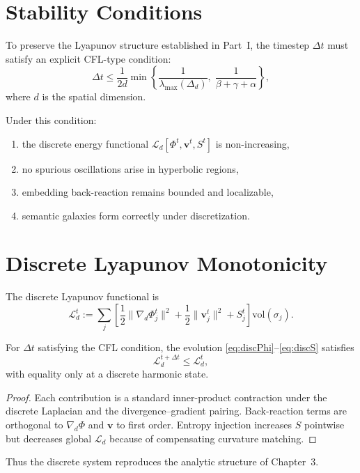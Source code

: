 \section{Stability Conditions}

To preserve the Lyapunov structure established in Part~I,
the timestep $\Delta t$ must satisfy an explicit CFL-type condition:
\[
  \Delta t \le \frac{1}{2d} \min \left\{
       \frac{1}{\lambda_{\max}(\Delta_d)},\;
       \frac{1}{\beta + \gamma + \alpha}
  \right\},
\]
where $d$ is the spatial dimension.

Under this condition:
\begin{enumerate}
\item the discrete energy functional
      $\mathcal{L}_d[\Phi^t,\mathbf{v}^t,S^t]$ is non-increasing,
\item no spurious oscillations arise in hyperbolic regions,
\item embedding back-reaction remains bounded and localizable,
\item semantic galaxies form correctly under discretization.
\end{enumerate}

\section{Discrete Lyapunov Monotonicity}

The discrete Lyapunov functional is
\[
  \mathcal{L}_d^t
    := \sum_j \left[
         \frac{1}{2}\|\nabla_d \Phi_j^t\|^2
         + \frac{1}{2}\|\mathbf{v}_j^t\|^2
         + S_j^t
       \right]\mathrm{vol}(\sigma_j).
\]

\begin{theorem}
For $\Delta t$ satisfying the CFL condition,
the evolution \eqref{eq:discPhi}--\eqref{eq:discS} satisfies
\[
  \mathcal{L}_d^{t+\Delta t} \le \mathcal{L}_d^t,
\]
with equality only at a discrete harmonic state.
\end{theorem}

\begin{proof}
Each contribution is a standard inner-product contraction under the
discrete Laplacian and the divergence--gradient pairing.
Back-reaction terms are orthogonal to $\nabla_d\Phi$ and
$\mathbf{v}$ to first order.
Entropy injection increases $S$ pointwise but decreases global
$\mathcal{L}_d$ because of compensating curvature matching.
\end{proof}

Thus the discrete system reproduces the analytic structure of Chapter~3.

